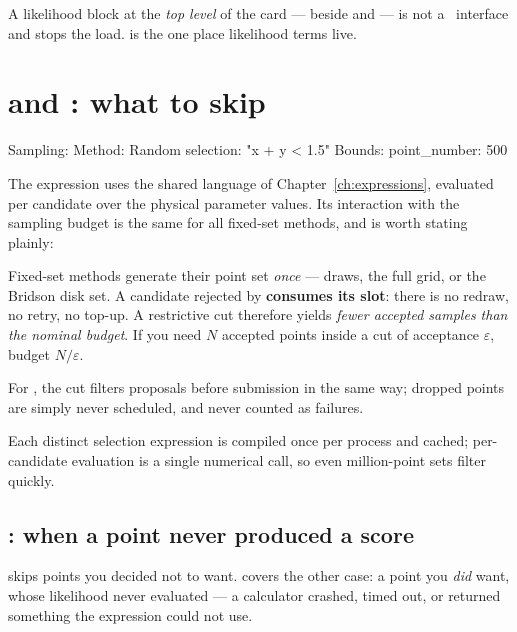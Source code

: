\begin{jwarn}
A likelihood block at the \emph{top level} of the card ---  beside
 and  --- is not a \Jtwo\ interface and stops the load.
 is the one place likelihood terms live.
\end{jwarn}

\section{ and : what to skip}
\label{sec:selection}

\begin{yamlwin}
Sampling:
  Method: Random
  selection: "x + y < 1.5"
  Bounds:
    point_number: 500
\end{yamlwin}

The expression uses the shared language of Chapter~\ref{ch:expressions}, evaluated per
candidate over the physical parameter values. Its interaction with the sampling budget is
the same for all fixed-set methods, and is worth stating plainly:

\begin{jwarn}
Fixed-set methods generate their point set \emph{once} ---
 draws, the full grid, or the Bridson disk set. A candidate rejected by
 \textbf{consumes its slot}: there is no redraw, no retry, no top-up.
A restrictive cut therefore yields \emph{fewer accepted samples than the nominal budget}.
If you need $N$ accepted points inside a cut of acceptance $\varepsilon$, budget
$N/\varepsilon$.
\end{jwarn}

For , the cut filters proposals before submission in the same
way; dropped points are simply never scheduled, and never counted as failures.

Each distinct selection expression is compiled once per process and cached; per-candidate
evaluation is a single numerical call, so even million-point sets filter quickly.

\subsection*{: when a point never produced a score}

 skips points you decided not to want.  covers the
other case: a point you \emph{did} want, whose likelihood never evaluated --- a calculator
crashed, timed out, or returned something the expression could not use.

